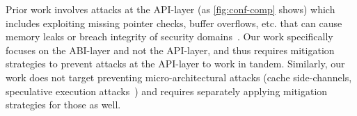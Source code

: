 Prior work involves attacks at the API-layer (as \autoref{fig:conf-comp} shows) which includes exploiting missing pointer checks, buffer overflows, etc. that can cause memory leaks or breach integrity of security domains~\cite{iago, totw}. 
Our work specifically focuses on the ABI-layer and not the API-layer, and thus requires mitigation strategies to prevent attacks at the API-layer to work in tandem. 
Similarly, our work does not target preventing micro-architectural attacks (cache side-channels, speculative execution attacks~\cite{spectre, meltdown, flush-reload}) and requires separately applying mitigation strategies for those as well.